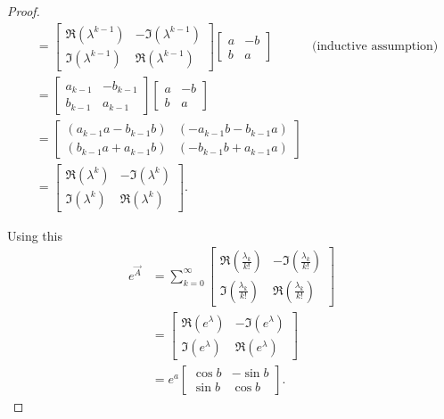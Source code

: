 \begin{proof}
\begin{align*}
		&=
		\begin{bmatrix}
			\Re(\lambda^{k - 1}) & -\Im(\lambda^{k - 1}) \\
			\Im(\lambda^{k - 1}) & \Re(\lambda^{k - 1})
		\end{bmatrix}
		\begin{bmatrix}
			a & -b \\
			b & a
		\end{bmatrix}  & \text{(inductive assumption)} \\
		&= 
		\begin{bmatrix}
			a_{k - 1} & -b_{k - 1} \\
			b_{k - 1} & a_{k - 1}
		\end{bmatrix}
		\begin{bmatrix}
			a & -b \\
			b & a
		\end{bmatrix} \\
		&=
		\begin{bmatrix}
			(a_{k - 1}a - b_{k - 1}b) & (-a_{k - 1}b - b_{k - 1}a) \\
			(b_{k - 1}a + a_{k - 1}b) & (-b_{k - 1}b + a_{k - 1}a)
		\end{bmatrix} \\
		&=
		\begin{bmatrix}
			\Re(\lambda^k)	& -\Im(\lambda^k) \\
			\Im(\lambda^k)	& \Re(\lambda^k)
		\end{bmatrix}.
	\end{align*}

	Using this
	\begin{align*}
		e^{\vec A}
		&=
		\sum_{k = 0}^\infty
		\begin{bmatrix}
			\Re(\frac{\lambda_k}{k!})	& -\Im(\frac{\lambda_k}{k!}) \\
			\Im(\frac{\lambda_k}{k!})	& \Re(\frac{\lambda_k}{k!})
		\end{bmatrix} \\
		&=
		\begin{bmatrix}
			\Re(e^\lambda)	& -\Im(e^\lambda) \\
			\Im(e^\lambda)	& \Re(e^\lambda)
		\end{bmatrix} \\
		&=
		e^a
		\begin{bmatrix}
			\cos b 	& -\sin b \\
			\sin b 	& \cos b
		\end{bmatrix}.
	\end{align*}
\end{proof}


